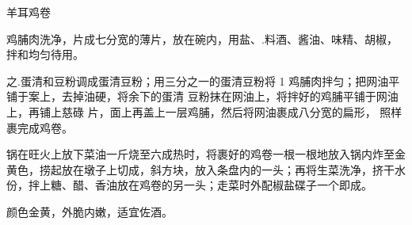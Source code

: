 \begin{recipe}{羊耳鸡卷}

\ingredients


\cooking

\step 鸡脯肉洗净，片成七分宽的薄片，放在碗内，用盐、.料酒、酱油、味精、胡椒，拌和均匀待用。

之.蛋清和豆粉调成蛋清豆粉；用三分之一的蛋清豆粉将 1 鸡脯肉拌匀；把网油平铺于案上，去掉油硬，将余下的蛋清 豆粉抹在网油上，将拌好的鸡脯平铺于网油上，再铺上慈碌 片，面上再盖上一层鸡脯，然后将网油裹成八分宽的扁形， 照样裹完成鸡卷。

\step 锅在旺火上放下菜油一斤烧至六成热时，将裹好的鸡卷一根一根地放入锅内炸至金黄色，捞起放在墩子上切成，斜方块，放入条盘内的一头；再将生菜洗净，挤干水份，拌上糖、醋、香油放在鸡卷的另一头；走菜时外配椒盐碟子一个即成。

\notes

颜色金黄，外脆内嫩，适宜佐酒。

\end{recipe}

